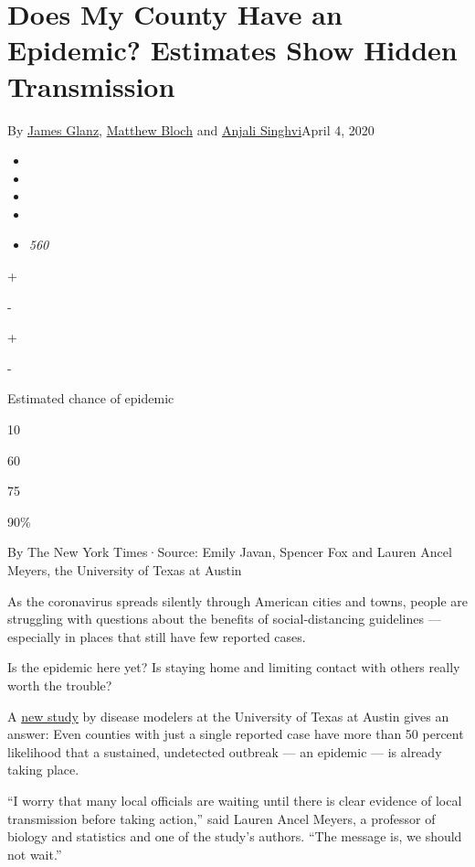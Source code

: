 \hypertarget{does-my-county-have-an-epidemic-estimates-show-hidden-transmission}{%
\section{Does My County Have an Epidemic? Estimates Show Hidden
Transmission}\label{does-my-county-have-an-epidemic-estimates-show-hidden-transmission}}

By \href{https://www.nytimes3xbfgragh.onion/by/james-glanz}{James
Glanz},
\href{https://www.nytimes3xbfgragh.onion/by/matthew-bloch}{Matthew
Bloch} and
\href{https://www.nytimes3xbfgragh.onion/by/anjali-singhvi}{Anjali
Singhvi}April 4, 2020

\begin{itemize}
\item
\item
\item
\item
\item
  \emph{560}
\end{itemize}

+

-

+

-

Estimated chance of epidemic

10

60

75

90\%

By The New York Times·Source: Emily Javan, Spencer Fox and Lauren Ancel
Meyers, the University of Texas at Austin

As the coronavirus spreads silently through American cities and towns,
people are struggling with questions about the benefits of
social-distancing guidelines --- especially in places that still have
few reported cases.

Is the epidemic here yet? Is staying home and limiting contact with
others really worth the trouble?

A
\href{https://cid.utexas.edu/sites/default/files/cid/files/covid-risk-maps_counties_4.3.2020.pdf?m=1585958755}{new
study} by disease modelers at the University of Texas at Austin gives an
answer: Even counties with just a single reported case have more than 50
percent likelihood that a sustained, undetected outbreak --- an epidemic
--- is already taking place.

``I worry that many local officials are waiting until there is clear
evidence of local transmission before taking action,'' said Lauren Ancel
Meyers, a professor of biology and statistics and one of the study's
authors. ``The message is, we should not wait.''

